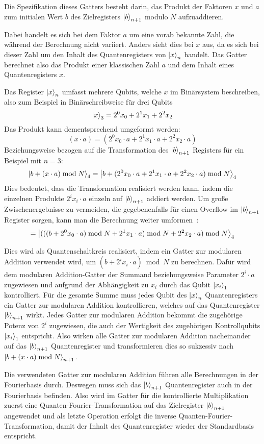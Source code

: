 Die Spezifikation dieses Gatters besteht darin, 
das Produkt der Faktoren \(x\) und \(a\) 
zum initialen Wert \(b\) des Zielregisters \(\ket{b}_{n+1}\) modulo \(N\) aufzuaddieren.

Dabei handelt es sich bei dem Faktor \(a\) um eine vorab bekannte Zahl, 
die während der Berechnung nicht variiert.
Anders sieht dies bei \(x\) aus, da es sich bei dieser Zahl um den Inhalt des Quantenregisters von \(\ket{x}_{n}\) handelt.
Das Gatter berechnet also das Produkt einer klassischen Zahl \(a\) und dem Inhalt eines Quantenregisters \(x\).

Das Register \(\ket{x}_{n}\) umfasst mehrere Qubits, 
welche \(x\) im Binärsystem beschreiben, 
also zum Beispiel in Binärschreibweise für drei Qubits 
\[\ket{x}_{3} = 2^0x_0+2^1x_1+2^2x_2\]
Das Produkt kann dementsprechend umgeformt werden: 
\[(x\cdot a)  = (2^0x_0\cdot a+2^1x_1\cdot a+2^2x_2\cdot a) \]
Beziehungsweise bezogen auf die Transformation des \(\ket{b}_{n+1}\) Registers für ein Beispiel mit \(n=3\):
\[\ket{b + (x\cdot a) \bmod N}_{4} = \ket{b + (2^0x_0\cdot a+2^1x_1\cdot a+2^2x_2\cdot a) \bmod N}_{4}\]
Dies bedeutet, dass die Transformation realisiert werden kann, 
indem die einzelnen Produkte \(2^ix_i\cdot a\) einzeln auf \(\ket{b}_{n+1}\) addiert werden.
Um große Zwischenergebnisse zu vermeiden, die gegebenenfalls für einen Overflow im \(\ket{b}_{n+1}\) Register sorgen, 
kann man die Berechnung weiter umformen~\cite{beauregard2003circuit}:
\[= \ket{(((b + 2^0x_0\cdot a)\bmod N+2^1x_1\cdot a)\bmod N+2^2x_2\cdot a) \bmod N}_{4}\]

Dies wird als Quantenschaltkreis realisiert, 
indem ein Gatter zur modularen Addition verwendet wird, 
um \((b + 2^ix_i\cdot a)\bmod N\) zu berechnen.
Dafür wird dem modularen Addition-Gatter der Summand beziehungsweise Parameter \(2^i\cdot a\) zugewiesen 
und aufgrund der Abhängigkeit zu \(x_i\) durch das Qubit \(\ket{x_i}_1\) kontrolliert.
Für die gesamte Summe muss jedes Qubit des \(\ket{x}_{n}\) Quantenregisters ein Gatter zur modularen Addition kontrollieren, 
welches auf das Quantenregister \(\ket{b}_{n+1}\) wirkt.
Jedes Gatter zur modularen Addition bekommt die zugehörige Potenz von \(2^i\) zugewiesen, 
die auch der Wertigkeit des zugehörigen Kontrollqubits \(\ket{x_i}_1\) entspricht.
Also wirken alle Gatter zur modularen Addition nacheinander auf das \(\ket{b}_{n+1}\) Quantenregister und 
transformieren dies so sukzessiv nach \(\ket{b + (x\cdot a) \bmod N}_{n+1}\).

Die verwendeten Gatter zur modularen Addition führen alle Berechnungen in der Fourierbasis durch.
Deswegen muss sich das \(\ket{b}_{n+1}\) Quantenregister auch in der Fourierbasis befinden.
Also wird im Gatter für die kontrollierte Multiplikation zuerst eine Quanten-Fourier-Transformation auf das Zielregister \(\ket{b}_{n+1}\) angewendet und 
als letzte Operation erfolgt die inverse Quanten-Fourier-Transformation, 
damit der Inhalt des Quantenregister wieder der Standardbasis entspricht.

